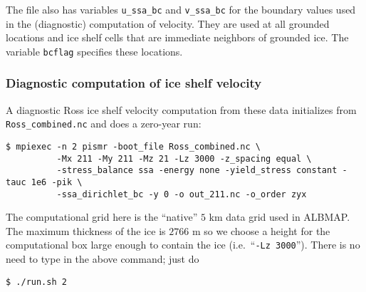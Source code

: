 The file also has variables \texttt{u_ssa_bc} and \texttt{v_ssa_bc} for the boundary values used in the (diagnostic) computation of velocity.  They are used at all grounded locations and ice shelf cells that are immediate neighbors of grounded ice.  The variable \texttt{bcflag} specifies these locations.


\subsubsection*{Diagnostic computation of ice shelf velocity}
A diagnostic Ross ice shelf velocity computation from these data initializes from \texttt{Ross_combined.nc} and does a zero-year run:

\begin{verbatim}
$ mpiexec -n 2 pismr -boot_file Ross_combined.nc \
          -Mx 211 -My 211 -Mz 21 -Lz 3000 -z_spacing equal \
          -stress_balance ssa -energy none -yield_stress constant -tauc 1e6 -pik \
          -ssa_dirichlet_bc -y 0 -o out_211.nc -o_order zyx
\end{verbatim}%
The computational grid here is the ``native'' $5$ km data grid used in ALBMAP.  The maximum thickness of the ice is $2766$ m so we choose a height for the computational box large enough to contain the ice (i.e.~``\texttt{-Lz 3000}'').  There is no need to type in the above command; just do

\begin{verbatim}
$ ./run.sh 2
\end{verbatim}%

